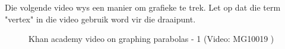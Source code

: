 \noindent
Die volgende video wys een manier om grafieke te trek. Let op dat die term "vertex" in die video gebruik word vir die draaipunt.
\setcounter{subfigure}{0}
\begin{figure}[H] %
\textnormal{Khan academy video on graphing parabolas - 1}\vspace{.1in} \nopagebreak
\label{m39345*yt-media1}\label{m39345*yt-video1}
 { (Video:  MG10019 )}
\vspace{2pt}
\vspace{.1in}
\end{figure} 

